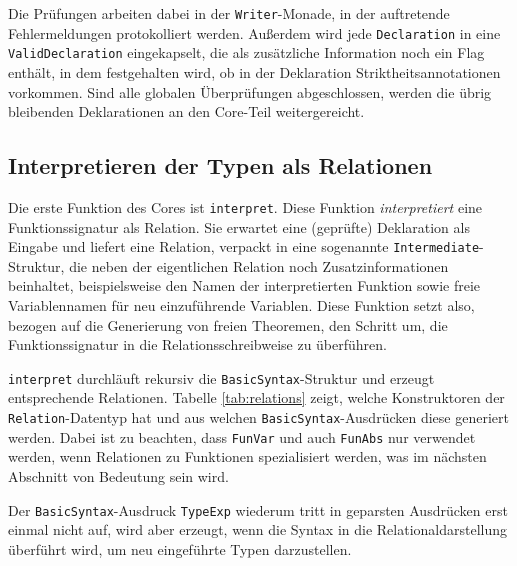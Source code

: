 Die Prüfungen arbeiten dabei in der \texttt{Writer}-Monade, in der auftretende Fehlermeldungen protokolliert werden. Außerdem
wird jede \texttt{Declaration} in eine \texttt{ValidDeclaration} eingekapselt, die als zusätzliche Information noch ein Flag enthält,
in dem festgehalten wird, ob in der Deklaration Striktheitsannotationen vorkommen.
Sind alle globalen Überprüfungen abgeschlossen, werden die übrig bleibenden Deklarationen an den Core-Teil weitergereicht.


\subsection{Interpretieren der Typen als Relationen}

\label{sec:free-theorems-interpret}

Die erste Funktion des Cores ist \texttt{interpret}. Diese Funktion \textit{interpretiert} eine Funktionssignatur als Relation. Sie
erwartet eine (geprüfte) Deklaration als Eingabe und liefert eine Relation, verpackt in eine sogenannte \texttt{Intermediate}-Struktur,
die neben der eigentlichen Relation noch Zusatzinformationen beinhaltet, beispielsweise den Namen der interpretierten Funktion
sowie freie Variablennamen für neu einzuführende Variablen.
Diese Funktion setzt also, bezogen auf die Generierung von freien Theoremen, den Schritt um, die Funktionssignatur in die
Relationsschreibweise zu überführen.

\texttt{interpret} durchläuft rekursiv die \texttt{BasicSyntax}-Struktur und erzeugt entsprechende Relationen.
Tabelle \ref{tab:relations} zeigt, welche Konstruktoren der \texttt{Relation}-Datentyp hat und aus welchen
\texttt{BasicSyntax}-Ausdrücken diese generiert werden. Dabei ist zu beachten, dass
\texttt{FunVar} und auch \texttt{FunAbs} nur verwendet werden, wenn Relationen zu Funktionen spezialisiert werden, was im
nächsten Abschnitt von Bedeutung sein wird.

Der \texttt{BasicSyntax}-Ausdruck \texttt{TypeExp} wiederum tritt in geparsten Ausdrücken erst einmal nicht auf, wird aber
erzeugt, wenn die Syntax in die Relationaldarstellung überführt wird, um neu eingeführte Typen darzustellen.


